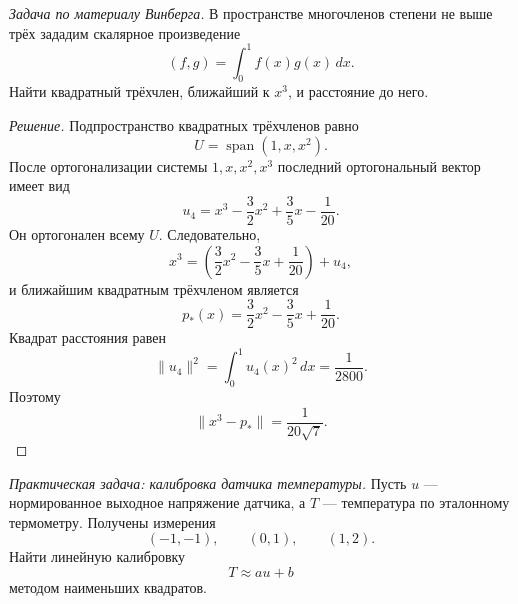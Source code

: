 \begin{problem}
\textit{Задача по материалу Винберга.}
В пространстве многочленов степени не выше трёх зададим скалярное произведение
\[
(f,g)=\int_0^1 f(x)g(x)\,dx.
\]
Найти квадратный трёхчлен, ближайший к \(x^3\), и расстояние до него.
\end{problem}

\begin{proof}[Решение]
Подпространство квадратных трёхчленов равно
\[
U=\operatorname{span}(1,x,x^2).
\]
После ортогонализации системы \(1,x,x^2,x^3\) последний ортогональный вектор имеет вид
\[
u_4
=
x^3-\frac32x^2+\frac35x-\frac1{20}.
\]
Он ортогонален всему \(U\). Следовательно,
\[
x^3
=
\left(
\frac32x^2-\frac35x+\frac1{20}
\right)
+
u_4,
\]
и ближайшим квадратным трёхчленом является
\[
p_\ast(x)
=
\frac32x^2-\frac35x+\frac1{20}.
\]
Квадрат расстояния равен
\[
\|u_4\|^2
=
\int_0^1 u_4(x)^2\,dx
=
\frac1{2800}.
\]
Поэтому
\[
\|x^3-p_\ast\|
=
\frac1{20\sqrt7}.
\]
\end{proof}

\begin{problem}
\textit{Практическая задача: калибровка датчика температуры.}
Пусть \(u\) --- нормированное выходное напряжение датчика, а \(T\) --- температура по эталонному термометру. Получены измерения
\[
(-1,-1),\qquad (0,1),\qquad (1,2).
\]
Найти линейную калибровку
\[
T\approx au+b
\]
методом наименьших квадратов.
\end{problem}

